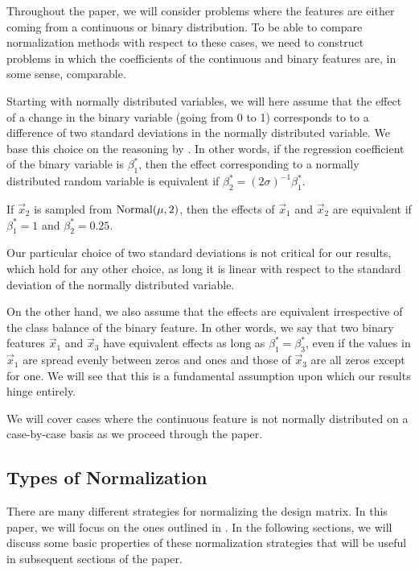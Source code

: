 Throughout the paper, we will consider problems where the features are either coming from a continuous or binary distribution. To be able to compare normalization methods with respect to these cases, we need to construct problems in which the coefficients of the continuous and binary features are, in some sense, comparable.

Starting with normally distributed variables, we will here assume that the effect of a change in the binary variable (going from 0 to 1) corresponds to to a difference of two standard deviations in the normally distributed variable. We base this choice on the reasoning by \textcite{gelman2008}. In other words, if the regression coefficient of the binary variable is \(\beta^*_1\), then the effect corresponding to a normally distributed random variable is equivalent if \(\beta^*_2 = (2\sigma)^{-1} \beta_1^*\).

\begin{example}
  If \(\vec{x}_2\) is sampled from \(\operatorname{Normal}(\mu, 2)\), then the effects of \(\vec{x}_1\) and \(\vec{x}_2\) are equivalent if \(\beta_1^* = 1\) and \(\beta_2^* = 0.25\).
\end{example}

Our particular choice of two standard deviations is not critical for our results, which hold for any other choice, as long it is linear with respect to the standard deviation of the normally distributed variable.

On the other hand, we also assume that the effects are equivalent irrespective of the class balance of the binary feature. In other words, we say that two binary features \(\vec{x}_1\) and \(\vec{x}_3\) have equivalent effects as long as \(\beta_1^* = \beta_3^*\), even if the values in \(\vec{x}_1\) are spread evenly between zeros and ones and those of \(\vec{x}_3\) are all zeros except for one. We will see that this is a fundamental assumption upon which our results hinge entirely.

We will cover cases where the continuous feature is not normally distributed on a case-by-case basis as we proceed through the paper.

\subsection{Types of Normalization}

There are many different strategies for normalizing the design matrix. In this paper, we will focus on the ones outlined in .
In the following sections, we will discuss some basic properties of these normalization strategies that will be useful in subsequent sections of the paper.

